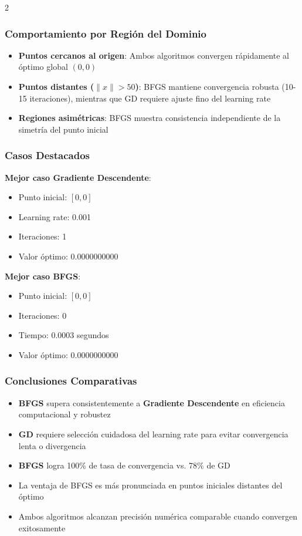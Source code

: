 \documentclass[11pt, a4paper, twocolumn]{beamer}
\begin{document}
\begin{multicols}{2}
\subsubsection{Comportamiento por Región del Dominio}

\begin{itemize}
	\item \textbf{Puntos cercanos al origen}: Ambos algoritmos convergen rápidamente al óptimo global $(0,0)$
	\item \textbf{Puntos distantes ($\|x\| > 50$)}: BFGS mantiene convergencia robusta (10-15 iteraciones), mientras que GD requiere ajuste fino del learning rate
	\item \textbf{Regiones asimétricas}: BFGS muestra consistencia independiente de la simetría del punto inicial
\end{itemize}

\subsubsection{Casos Destacados}

\textbf{Mejor caso Gradiente Descendente}:
\begin{itemize}
	\item Punto inicial: $[0, 0]$
	\item Learning rate: 0.001
	\item Iteraciones: 1
	\item Valor óptimo: $0.0000000000$
\end{itemize}

\textbf{Mejor caso BFGS}:
\begin{itemize}
	\item Punto inicial: $[0, 0]$ 
	\item Iteraciones: 0
	\item Tiempo: 0.0003 segundos
	\item Valor óptimo: $0.0000000000$
\end{itemize}

\subsubsection{Conclusiones Comparativas}

\begin{itemize}
	\item \textbf{BFGS} supera consistentemente a \textbf{Gradiente Descendente} en eficiencia computacional y robustez
	\item \textbf{GD} requiere selección cuidadosa del learning rate para evitar convergencia lenta o divergencia
	\item \textbf{BFGS} logra 100\% de tasa de convergencia vs. 78\% de GD
	\item La ventaja de BFGS es más pronunciada en puntos iniciales distantes del óptimo
	\item Ambos algoritmos alcanzan precisión numérica comparable cuando convergen exitosamente
\end{itemize}
\end{multicols}
\end{document}
